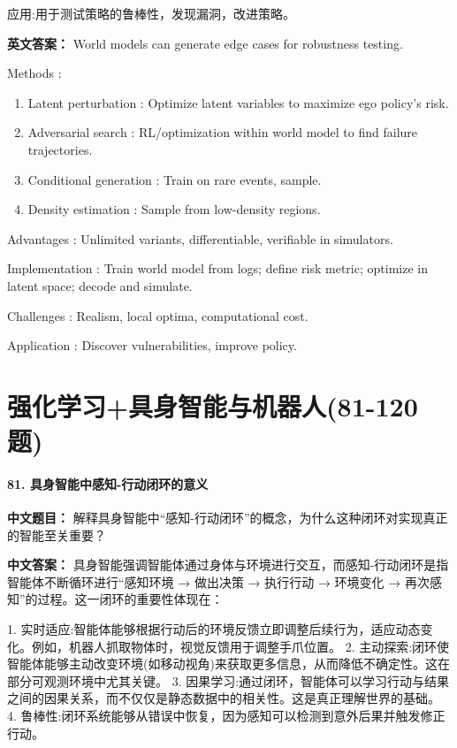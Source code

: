 \documentclass[10pt,a4paper]{ctexart}
\begin{document}
 应用:用于测试策略的鲁棒性，发现漏洞，改进策略。

\textbf{英文答案：}  
World models can generate edge cases for robustness testing.

 Methods :
\begin{enumerate}
    \item Latent perturbation : Optimize latent variables to maximize ego policy's risk.
    \item Adversarial search : RL/optimization within world model to find failure trajectories.
    \item Conditional generation : Train on rare events, sample.
    \item Density estimation : Sample from low-density regions.
\end{enumerate}

 Advantages : Unlimited variants, differentiable, verifiable in simulators.

 Implementation : Train world model from logs; define risk metric; optimize in latent space; decode and simulate.

 Challenges : Realism, local optima, computational cost.

 Application : Discover vulnerabilities, improve policy.

\part{强化学习+具身智能与机器人(81-120题)}

\subsection*{81. 具身智能中感知-行动闭环的意义}
\textbf{中文题目：} 解释具身智能中“感知-行动闭环”的概念，为什么这种闭环对实现真正的智能至关重要？

\textbf{中文答案：}  
具身智能强调智能体通过身体与环境进行交互，而感知-行动闭环是指智能体不断循环进行“感知环境 → 做出决策 → 执行行动 → 环境变化 → 再次感知”的过程。这一闭环的重要性体现在：

1.  实时适应:智能体能够根据行动后的环境反馈立即调整后续行为，适应动态变化。例如，机器人抓取物体时，视觉反馈用于调整手爪位置。
2.  主动探索:闭环使智能体能够主动改变环境(如移动视角)来获取更多信息，从而降低不确定性。这在部分可观测环境中尤其关键。
3.  因果学习:通过闭环，智能体可以学习行动与结果之间的因果关系，而不仅仅是静态数据中的相关性。这是真正理解世界的基础。
4.  鲁棒性:闭环系统能够从错误中恢复，因为感知可以检测到意外后果并触发修正行动。
\end{document}
